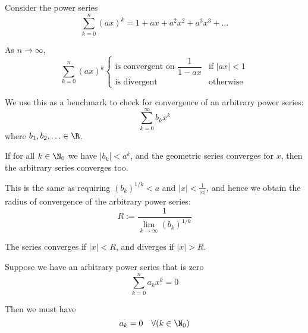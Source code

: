 \label{ea9daf1}

Consider the power series
$$
	\sum_{k=0}^n(ax)^k=1+ax+a^2x^2+a^3x^3+\ldots
$$

As $n\to\infty$,
$$
	\sum_{k=0}^n(ax)^k\begin{cases}
		\text{is convergent on }\dfrac1{1-ax} & \text{if }|ax|<1 \\
		\text{is divergent}                   & \text{otherwise}
	\end{cases}
$$

We use this as a benchmark to check for convergence of an arbitrary
power series:
$$
	\sum_{k=0}^\infty b_kx^k
$$
where $b_1,b_2,\ldots\in\R$.

If for all $k\in\N_0$ we have $|b_k|<a^k$, and the geometric series
converges for $x$, then the arbitrary series converges too.

This is the same as requiring $(b_k)^{1/k}<a$ and $|x|<\frac1{|a|}$,
and hence we obtain the radius of convergence of the arbitrary power
series:
$$
	R:=\frac{1}{\displaystyle\lim_{k\to\infty}(b_k)^{1/k}}
$$

The series converges if $|x|<R$, and diverges if $|x|>R$.


Suppose we have an arbitrary power series that is zero
$$
	\sum_{k=0}^na_kx^k = 0
$$

Then we must have
$$
a_k=0\quad\forall(k\in\N_0)
$$
